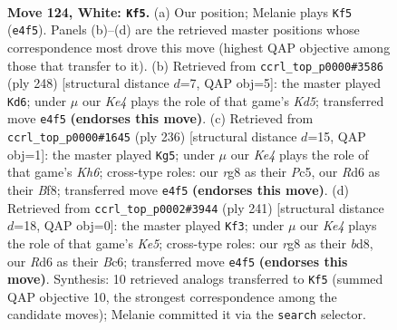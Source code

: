 \documentclass[11pt]{article}
\begin{document}
\clearpage

\begin{figure}[p]\centering
\begin{subfigure}{0.46\textwidth}\centering
\resizebox{\linewidth}{!}{%
\newchessgame
\chessboard[
  setfen={6r1/2B4k/3R4/P7/4K3/8/8/8 w - - 17 124},
  showmover=false,
  pgfstyle=straightmove, color=movearrow, markmove={e4-f5}
]}
\caption{}
\end{subfigure}\hfill
\begin{subfigure}{0.46\textwidth}\centering
\resizebox{\linewidth}{!}{%
\newchessgame
\chessboard[
  setfen={2r5/1k6/7P/3K4/8/1b2B3/5R2/8 w - - 15 125},
  showmover=false,
  pgfstyle=straightmove, color=movearrow, markmove={d5-d6}
]}
\caption{}
\end{subfigure}
\\[4pt]
\begin{subfigure}{0.46\textwidth}\centering
\resizebox{\linewidth}{!}{%
\newchessgame
\chessboard[
  setfen={5B2/P7/4k2K/2P5/8/8/8/7b w - - 7 119},
  showmover=false,
  pgfstyle=straightmove, color=movearrow, markmove={h6-g5}
]}
\caption{}
\end{subfigure}\hfill
\begin{subfigure}{0.46\textwidth}\centering
\resizebox{\linewidth}{!}{%
\newchessgame
\chessboard[
  setfen={3B4/8/2b5/7p/4kp2/8/8/6K1 b - - 89 121},
  showmover=false,
  pgfstyle=straightmove, color=movearrow, markmove={e4-f3}
]}
\caption{}
\end{subfigure}
\caption{\textbf{Move 124, White: \texttt{Kf5}.} (a) Our position; Melanie plays \texttt{Kf5} (\texttt{e4f5}). Panels (b)--(d) are the retrieved master positions whose correspondence most drove this move (highest QAP objective among those that transfer to it). (b) Retrieved from \texttt{ccrl\_top\_p0000\#3586} (ply 248) [structural distance $d$=7, QAP obj=5]: the master played \texttt{Kd6}; under $\mu$ our \emph{Ke4} plays the role of that game's \emph{Kd5}; transferred move \texttt{e4f5} \textbf{(endorses this move)}. (c) Retrieved from \texttt{ccrl\_top\_p0000\#1645} (ply 236) [structural distance $d$=15, QAP obj=1]: the master played \texttt{Kg5}; under $\mu$ our \emph{Ke4} plays the role of that game's \emph{Kh6}; cross-type roles: our \emph{r}g8 as their \emph{P}c5, our \emph{R}d6 as their \emph{B}f8; transferred move \texttt{e4f5} \textbf{(endorses this move)}. (d) Retrieved from \texttt{ccrl\_top\_p0002\#3944} (ply 241) [structural distance $d$=18, QAP obj=0]: the master played \texttt{Kf3}; under $\mu$ our \emph{Ke4} plays the role of that game's \emph{Ke5}; cross-type roles: our \emph{r}g8 as their \emph{b}d8, our \emph{R}d6 as their \emph{B}c6; transferred move \texttt{e4f5} \textbf{(endorses this move)}. Synthesis: 10 retrieved analogs transferred to \texttt{Kf5} (summed QAP objective 10, the strongest correspondence among the candidate moves); Melanie committed it via the \texttt{search} selector.}
\label{fig:thought-m246}
\end{figure}
\end{document}
